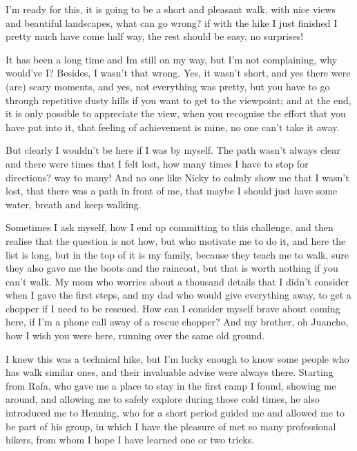 

I'm ready for this, it is going to be a short and pleasant walk, with nice views and beautiful landscapes, what can go wrong? if with the hike I just finished I pretty much have come half way, the rest should be easy, no surprises!

It has been a long time and Im still on my way, but I'm not complaining, why would've I? Besides, I wasn't that wrong. Yes, it wasn't short, and yes there were (are) scary moments, and yes, not everything was pretty, but you have to go through repetitive dusty hills if you want to get to the viewpoint; and at the end, it is only possible to appreciate the view, when you recognise the effort that you have put into it, that feeling of achievement is mine, no one can't take it away. 

But clearly I wouldn't be here if I was by myself. The path wasn't always clear and there were times that I felt lost, how many times I have to stop for directions? way to many! And no one like Nicky to calmly show me that I wasn't lost, that there was a path in front of me, that maybe I should just have some water, breath and keep walking. 

Sometimes I ask myself, how I end up committing to this challenge, and then realise that the question is not how, but who motivate me to do it, and here the list is long, but in the top of it is my family, because they teach me to walk, sure they also gave me the boots and the raincoat, but that is worth nothing if you can't walk. My mom who worries about a thousand details that I didn't consider when I gave the first steps, and my dad who would give everything away, to get a chopper if I need to be rescued. How can I consider myself brave about coming here, if I'm a phone call away of a rescue chopper? And my brother, oh Juancho, how I wish you were here, running over the same old ground.

I knew this was a technical hike, but I'm lucky enough to know some people who has walk similar ones, and their invaluable advise were always there. Starting from Rafa, who gave me a place to stay in the first camp I found, showing me around, and allowing me to safely explore during those cold times, he also introduced me to Henning, who for a short period guided me and allowed me to be part of his group, in which I have the pleasure of met so many professional hikers, from whom I hope I have learned one or two tricks.

